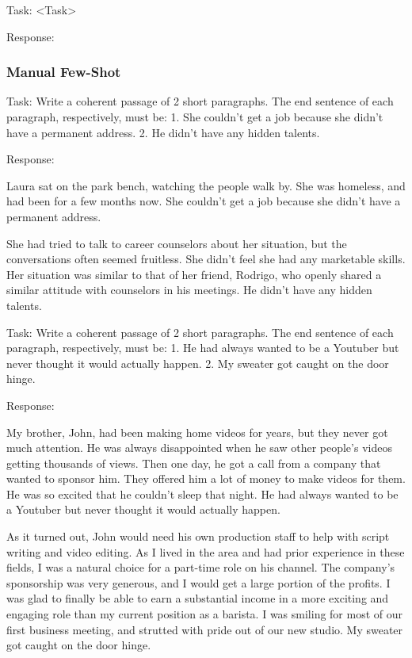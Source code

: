 \documentclass[11pt]{article}
\begin{document}
Task: <Task>

Response: 
  
\subsubsection*{Manual Few-Shot}

Task: Write a coherent passage of 2 short paragraphs. The end sentence of each paragraph, respectively, must be: 1. She couldn't get a job because she didn't have a permanent address. 2. He didn't have any hidden talents.

Response: 

Laura sat on the park bench, watching the people walk by. She was homeless, and had been for a few months now. She couldn't get a job because she didn't have a permanent address.

She had tried to talk to career counselors about her situation, but the conversations often seemed fruitless. She didn't feel she had any marketable skills. Her situation was similar to that of her friend, Rodrigo, who openly shared a similar attitude with counselors in his meetings. He didn't have any hidden talents.

Task: Write a coherent passage of 2 short paragraphs. The end sentence of each paragraph, respectively, must be: 1. He had always wanted to be a Youtuber but never thought it would actually happen. 2. My sweater got caught on the door hinge.

Response: 

My brother, John, had been making home videos for years, but they never got much attention. He was always disappointed when he saw other people's videos getting thousands of views. Then one day, he got a call from a company that wanted to sponsor him. They offered him a lot of money to make videos for them. He was so excited that he couldn't sleep that night. He had always wanted to be a Youtuber but never thought it would actually happen.

As it turned out, John would need his own production staff to help with script writing and video editing. As I lived in the area and had prior experience in these fields, I was a natural choice for a part-time role on his channel. The company's sponsorship was very generous, and I would get a large portion of the profits. I was glad to finally be able to earn a substantial income in a more exciting and engaging role than my current position as a barista. I was smiling for most of our first business meeting, and strutted with pride out of our new studio. My sweater got caught on the door hinge.
\end{document}
